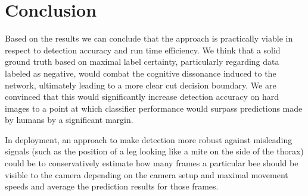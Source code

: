 \documentclass[12pt,a4paper]{article}
\begin{document}
\section{Conclusion}
Based on the results we can conclude that the approach is practically viable in respect to detection accuracy and run time efficiency. We think that a solid ground truth based on maximal label certainty, particularly regarding data labeled as negative, would combat the cognitive dissonance induced to the network, ultimately leading to a more clear cut decision boundary. We are convinced that this would significantly increase detection accuracy on hard images to a point at which classifier performance would surpass predictions made by humans by a significant margin.

In deployment, an approach to make detection more robust against misleading signals (such as the position of a leg looking like a mite on the side of the thorax) could be to conservatively estimate how many frames a particular bee should be visible to the camera depending on the camera setup and maximal movement speeds and average the prediction results for those frames.



\end{document}
